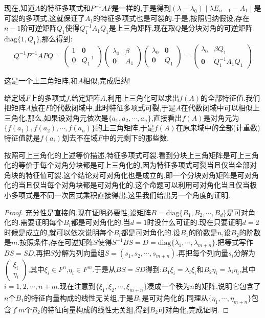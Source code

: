 现在,知道$A$的特征多项式和$P^{-1}AP$是一样的,于是得到$(\lambda-\lambda_0)\mid\lambda E_{n-1}-A_1\mid$是可裂的多项式,这就保证了$A_1$的特征多项式也是可裂的.于是,按照归纳假设,存在$n-1$阶可逆矩阵$Q_1$使得$Q_1^{-1}A_1Q_1$是上三角矩阵,现在取$Q$是分块对角的可逆矩阵$\mathrm{diag}\{1,Q_1\}$,那么得到:
$$Q^{-1}P^{-1}APQ=\left(\begin{array}{cc}
1&\textbf{0}\\
\textbf{0}&Q_1^{-1}\end{array}\right)\left(\begin{array}{cc}
\lambda_0&\beta\\
\textbf{0}&A_1\end{array}\right)\left(\begin{array}{cc}
\lambda_0&\textbf{0}\\
\textbf{0}&Q_1\end{array}\right)=\left(\begin{array}{cc}
\lambda_0&\beta Q_1\\
\textbf{0}&Q_1^{-1}A_1Q_1\end{array}\right)$$

这是一个上三角矩阵,和$A$相似,完成归纳!

给定域$F$上的多项式$f$,给定矩阵$A$,利用上三角化可以求出$f(A)$的全部特征值.我们把矩阵$A$放在$F$的代数闭域中,此时特征多项式可裂,于是$A$在代数闭域中可以相似上三角化,那么,如果设对角元依次是$\{a_1,a_2,\cdots,a_n\}$,直接看出$f(A)$是对角元为$\{f(a_1),f(a_2),\cdots,f(a_n)\}$的上三角矩阵,于是$f(A)$在原来域中的全部(计重数)特征值就是$f(a_i)$划去不在域$F$中的元剩下的那些数.

按照可上三角化的上述等价描述,特征多项式可裂.看到分块上三角矩阵是可上三角化的等价于每个对角分块都是可上三角化的,因为特征多项式可裂当且仅当全部对角块的特征值可裂.这个结论对可对角化也是成立的,即一个分块对角矩阵是可对角化的当且仅当每个对角块都是可对角化的.这个命题可以利用可对角化当且仅当极小多项式是不同一次因式乘积直接得出,这里我们给出另一个角度的证明.
\begin{proof}

充分性是直接的.现在证明必要性,设矩阵$B=\mathrm{diag}\{B_1,B_2,\cdots,B_d\}$是可对角化的.需要证明每个$B_i$都是可对角化的.当$d=1$时没什么可证的.现在只要证明$d=2$时候是成立的,就可以依次说明每个$B_i$都是可对角化的.设$B_1$的阶数是$n$,设$B_2$的阶数是$m$.按照条件,存在可逆矩阵$S$使得$S^{-1}BS=D=\mathrm{diag}\{\lambda_1,\cdots,\lambda_{m+n}\}$.把等式写作$BS=SD$,再把$S$分解为列向量组$S=(s_1,s_2,\cdots,s_{m+n})$.再把每个列向量$s_i$分解为$\left(\begin{array}{c}
\xi_i\\
\eta_i\end{array}\right)$,其中$\xi_i\in F^n$,$\eta_i\in F^m$.于是从$BS=SD$得到:$B_1\xi_i=\lambda_i\xi_i$和$B_2\eta_i=\lambda_i\eta_i$,其中$i=1,2,\cdots,n+m$.现在注意到$\{\xi_1,\xi_2,\cdots,\xi_{m+n}\}$凑成一个秩为$n$的矩阵,说明它包含了$n$个$B_1$的特征向量构成的线性无关组,于是$B_1$是可对角化的.同理从$\{\eta_1,\cdots,\eta_{m+n}\}$包含了$m$个$B_2$的特征向量构成的线性无关组,得到$B_2$可对角化,完成证明.
\end{proof}
\newpage
